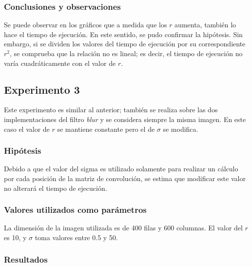 		\subsubsection*{Conclusiones y observaciones}
			Se puede observar en los gráficos que a medida que los $r$ aumenta, también lo hace el tiempo de ejecución. En este sentido, se pudo confirmar la hipótesis. Sin embargo, si se dividen los valores del tiempo de ejecución por su correspondiente $r^2$, se comprueba que la relación no es lineal; es decir, el tiempo de ejecución no varía cuadráticamente con el valor de $r$.


	\subsection{Experimento 3}
		Este experimento es similar al anterior; también se realiza sobre las dos implementaciones del filtro \emph{blur} y se considera siempre la misma imagen. En este caso el valor de $r$ se mantiene constante pero el de $\sigma$ se modifica.

			\subsubsection*{Hipótesis} 
				Debido a que el valor del sigma es utilizado solamente para realizar un cálculo por cada posición de la matriz de convolución, se estima que modificar este valor no alterará el tiempo de ejecución.

			\subsubsection*{Valores utilizados como parámetros} 
				La dimensión de la imagen utilizada es de 400 filas y 600 columnas. El valor del $r$ es 10, y $\sigma$ toma valores entre 0.5 y 50.

			\subsubsection*{Resultados}

